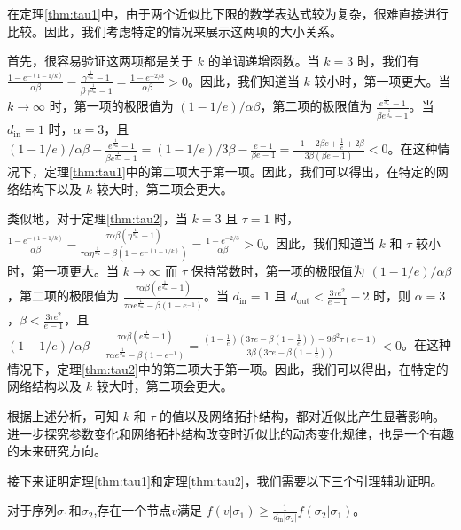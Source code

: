 在定理\ref{thm:tau1}中，由于两个近似比下限的数学表达式较为复杂，很难直接进行比较。因此，我们考虑特定的情况来展示这两项的大小关系。

首先，很容易验证这两项都是关于 $k$ 的单调递增函数。当 $k=3$ 时，我们有 $\frac{1-e^{-(1-1/k)}}{\alpha\beta}-\frac{\gamma^{\frac{1}{d_{\text{in}}}}-1}{\beta \gamma^{\frac{1}{d_{\text{in}}}}-1} = \frac{1-e^{-2/3}}{\alpha \beta}>0$。因此，我们知道当 $k$ 较小时，第一项更大。当 $k \to \infty$ 时，第一项的极限值为 $(1-1/e)/\alpha\beta$，第二项的极限值为 $\frac{e^{\frac{1}{d_{\text{in}}}}-1}{\beta e^{\frac{1}{d_{\text{in}}}}-1}$。当 $d_{\text{in}}=1$ 时，$\alpha=3$，且 $(1-1/e)/\alpha\beta-\frac{e^{\frac{1}{d_{\text{in}}}}-1}{\beta e^{\frac{1}{d_{\text{in}}}}-1} =(1-1/e)/3\beta-\frac{e-1}{\beta e-1}=\frac{-1-2\beta e +\frac{1}{e}+2\beta}{3\beta(\beta e-1)}<0$。在这种情况下，定理\ref{thm:tau1}中的第二项大于第一项。因此，我们可以得出，在特定的网络结构下以及 $k$ 较大时，第二项会更大。

类似地，对于定理\ref{thm:tau2}，当 $k=3$ 且 $\tau=1$ 时，$\frac{1-e^{-(1-1/k)}}{\alpha\beta}-\frac{\tau\alpha\beta(\eta^{\frac{1}{d_{\text{in}}}}-1)}{\tau\alpha\eta^{\frac{1}{d_{\text{in}}}}- \beta (1-e^{-(1-1/k)})} = \frac{1-e^{-2/3}}{\alpha \beta}>0$。因此，我们知道当 $k$ 和 $\tau$ 较小时，第一项更大。当 $k \to \infty$ 而 $\tau$ 保持常数时，第一项的极限值为 $(1-1/e)/\alpha\beta$，第二项的极限值为 $\frac{\tau\alpha\beta(e^{\frac{1}{d_{\text{in}}}}-1)}{\tau\alpha e^{\frac{1}{d_{\text{in}}}}- \beta (1-e^{-1}) }$。当 $d_{\text{in}}=1$ 且 $d_{\text{out}}<\frac{3\tau e^2}{e-1}-2$ 时，则 $\alpha=3$，$\beta < \frac{3\tau e^2}{e-1}$，且 $(1-1/e)/\alpha\beta-\frac{\tau\alpha\beta(e^{\frac{1}{d_{\text{in}}}}-1)}{\tau\alpha e^{\frac{1}{d_{\text{in}}}}- \beta (1-e^{-1}) } = \frac{(1-\frac{1}{e})(3\tau e -\beta(1-\frac{1}{e}))-9\beta^2 \tau(e-1)}{3\beta(3\tau e -\beta(1-\frac{1}{e}))}<0$。在这种情况下，定理\ref{thm:tau2}中的第二项大于第一项。因此，我们可以得出，在特定的网络结构以及 $k$ 较大时，第二项会更大。

根据上述分析，可知 $k$ 和 $\tau$ 的值以及网络拓扑结构，都对近似比产生显著影响。进一步探究参数变化和网络拓扑结构改变时近似比的动态变化规律，也是一个有趣的未来研究方向。

接下来证明定理\ref{thm:tau1}和定理\ref{thm:tau2}，我们需要以下三个引理辅助证明。

\begin{lemma}
\label{lem:lem1}
对于序列$\sigma_1$和$\sigma_2$,存在一个节点$v$满足 $f(v|\sigma_1) \ge \frac{1}{d_{\text{in}}|\sigma_2|} f(\sigma_2|\sigma_1)$。
\end{lemma}

